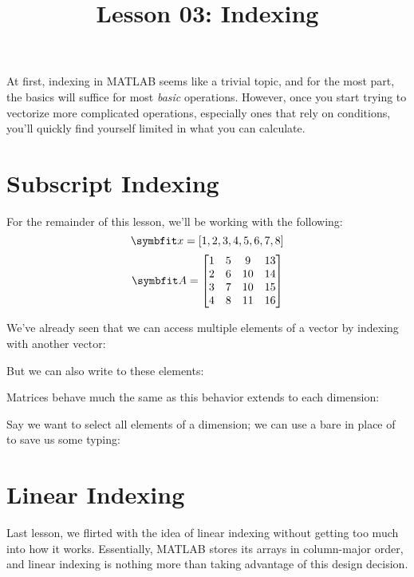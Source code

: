 \documentclass{article}
\title{Lesson 03: Indexing}
\begin{document}
\renderTitle

At first, indexing in MATLAB seems like a trivial topic, and for the
most part, the basics will suffice for most \emph{basic} operations.
However, once you start trying to vectorize more complicated operations,
especially ones that rely on conditions, you'll quickly find yourself
limited in what you can calculate.

\section{Subscript Indexing}

For the remainder of this lesson, we'll be working with the following:
\begin{equation}
	\mat{x}
	=
	[1, 2, 3, 4, 5, 6, 7, 8]
\end{equation}
\begin{equation}
	\mat{A}
	=
	\begin{bmatrix}
		1 & 5 &  9 & 13 \\
		2 & 6 & 10 & 14 \\
		3 & 7 & 10 & 15 \\
		4 & 8 & 11 & 16 \\
	\end{bmatrix}
\end{equation}

We've already seen that we can access multiple elements of a vector by
indexing with another vector:


But we can also write to these elements:


Matrices behave much the same as this behavior extends to each
dimension:


Say we want to select all elements of a dimension; we can use a bare
\mCommand{:} in place of  to save us some typing:


\section{Linear Indexing}

Last lesson, we flirted with the idea of linear indexing without getting
too much into how it works.  Essentially, MATLAB stores its arrays in
column-major order,  and linear indexing is nothing more than taking
advantage of this design decision.
\end{document}
